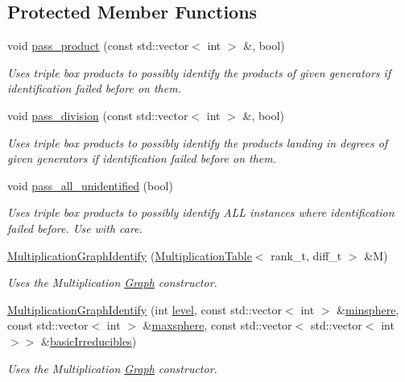 \subsection*{Protected Member Functions}
\begin{DoxyCompactItemize}
\item 
void \hyperlink{classMackey_1_1MultiplicationGraphIdentify_af3019970f4431d1930f75418fb134441}{pass\+\_\+product} (const std\+::vector$<$ int $>$ \&, bool)
\begin{DoxyCompactList}\small\item\em Uses triple box products to possibly identify the products of given generators if identification failed before on them. \end{DoxyCompactList}\item 
void \hyperlink{classMackey_1_1MultiplicationGraphIdentify_a5c945ebff968abe788e22b025b2455ed}{pass\+\_\+division} (const std\+::vector$<$ int $>$ \&, bool)
\begin{DoxyCompactList}\small\item\em Uses triple box products to possibly identify the products landing in degrees of given generators if identification failed before on them. \end{DoxyCompactList}\item 
void \hyperlink{classMackey_1_1MultiplicationGraphIdentify_a0474299a4f315e6e58c8ad8dd0a66fb5}{pass\+\_\+all\+\_\+unidentified} (bool)
\begin{DoxyCompactList}\small\item\em Uses triple box products to possibly identify A\+LL instances where identification failed before. Use with care. \end{DoxyCompactList}\item 
\hyperlink{classMackey_1_1MultiplicationGraphIdentify_a14b3d3ea4be57324231fd206354fa627}{Multiplication\+Graph\+Identify} (\hyperlink{classMackey_1_1MultiplicationTable}{Multiplication\+Table}$<$ rank\+\_\+t, diff\+\_\+t $>$ \&M)
\begin{DoxyCompactList}\small\item\em Uses the Multiplication \hyperlink{classMackey_1_1Graph}{Graph} constructor. \end{DoxyCompactList}\item 
\hyperlink{classMackey_1_1MultiplicationGraphIdentify_afeeb10a0f941f3a9f7bad8da4368a677}{Multiplication\+Graph\+Identify} (int \hyperlink{classMackey_1_1MultiplicationTable_ad5a05c126e0b3c769fa9b1196a8db96a}{level}, const std\+::vector$<$ int $>$ \&\hyperlink{classMackey_1_1MultiplicationTable_a071f7d7c6cd1c75836b64ea8e9923b49}{minsphere}, const std\+::vector$<$ int $>$ \&\hyperlink{classMackey_1_1MultiplicationTable_a4355003c6be4a4f857eba151c8e5bcf6}{maxsphere}, const std\+::vector$<$ std\+::vector$<$ int $>$$>$ \&\hyperlink{classMackey_1_1MultiplicationTable_af6896ea01c087e71533de423d7cf65ac}{basic\+Irreducibles})
\begin{DoxyCompactList}\small\item\em Uses the Multiplication \hyperlink{classMackey_1_1Graph}{Graph} constructor. \end{DoxyCompactList}\end{DoxyCompactItemize}
